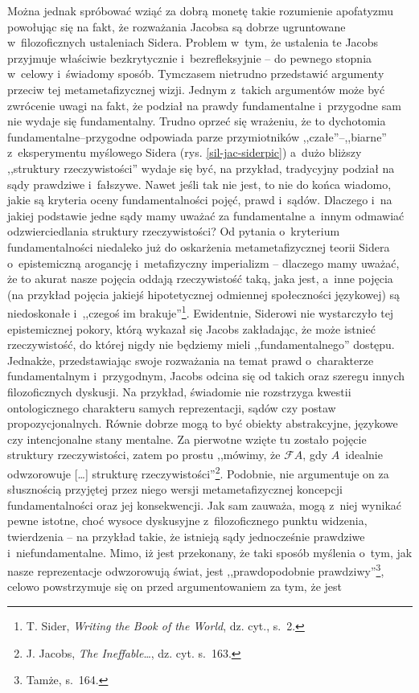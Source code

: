 Można jednak spróbować wziąć za dobrą monetę takie rozumienie apofatyzmu powołując się na fakt, że rozważania Jacobsa są dobrze ugruntowane w~filozoficznych ustaleniach Sidera. Problem w~tym, że ustalenia te Jacobs przyjmuje właściwie bezkrytycznie i~bezrefleksyjnie -- do pewnego stopnia w~celowy i~świadomy sposób. Tymczasem nietrudno przedstawić argumenty przeciw tej metametafizycznej wizji. Jednym z~takich argumentów może być zwrócenie uwagi na fakt, że podział na prawdy fundamentalne i~przygodne sam nie wydaje się fundamentalny. Trudno oprzeć się wrażeniu, że to dychotomia fundamentalne–przygodne odpowiada parze przymiotników ,,czałe''–,,biarne'' z~eksperymentu myślowego Sidera (rys. \ref{sil-jac-siderpic}) a~dużo bliższy ,,struktury rzeczywistości'' wydaje się być, na przykład, tradycyjny podział na sądy prawdziwe i~fałszywe. Nawet jeśli tak nie jest, to nie do końca wiadomo, jakie są kryteria oceny fundamentalności pojęć, prawd i~sądów. Dlaczego i~na jakiej podstawie jedne sądy mamy uważać za fundamentalne a~innym odmawiać odzwierciedlania struktury rzeczywistości? Od pytania o~kryterium fundamentalności niedaleko już do oskarżenia metametafizycznej teorii Sidera o~epistemiczną arogancję i~metafizyczny imperializm -- dlaczego mamy uważać, że to akurat nasze pojęcia oddają rzeczywistość taką, jaka jest, a~inne pojęcia (na przykład pojęcia jakiejś hipotetycznej odmiennej społeczności językowej) są niedoskonałe i~,,czegoś im brakuje''\footnote{T. Sider, \textit{Writing the Book of the World}, dz. cyt., s.~2.}. Ewidentnie, Siderowi nie wystarczyło tej epistemicznej pokory, którą wykazał się Jacobs zakładając, że może istnieć rzeczywistość, do której nigdy nie będziemy mieli ,,fundamentalnego'' dostępu. Jednakże, przedstawiając swoje rozważania na temat prawd o~charakterze fundamentalnym i~przygodnym, Jacobs odcina się od takich oraz szeregu innych filozoficznych dyskusji. Na przykład, świadomie nie rozstrzyga kwestii ontologicznego charakteru samych reprezentacji, sądów czy postaw propozycjonalnych. Równie dobrze mogą to być obiekty abstrakcyjne, językowe czy intencjonalne stany mentalne. Za pierwotne wzięte tu zostało pojęcie struktury rzeczywistości, zatem po prostu ,,mówimy, że \guillemotleft$\mathscr{F}A$\guillemotright, gdy $A$~idealnie odwzorowuje [\ldots] strukturę rzeczywistości''\footnote{J. Jacobs, \textit{The Ineffable}\ldots, dz. cyt. s.~163.}. Podobnie, nie argumentuje on za słusznością przyjętej przez niego wersji metametafizycznej koncepcji fundamentalności oraz jej konsekwencji. Jak sam zauważa, mogą z~niej wynikać pewne istotne, choć wysoce dyskusyjne z~filozoficznego punktu widzenia, twierdzenia -- na przykład takie, że istnieją sądy jednocześnie prawdziwe i~niefundamentalne. Mimo, iż jest przekonany, że taki sposób myślenia o~tym, jak nasze reprezentacje odwzorowują świat, jest ,,prawdopodobnie prawdziwy''\footnote{Tamże, s.~164.}, celowo powstrzymuje się on przed argumentowaniem za tym, że jest

